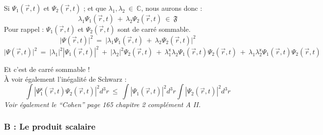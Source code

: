 \documentclass[12pt,a4paper,titlepage]{book}
\begin{document}
Si $\Psi_1 (\overrightarrow{r}, t)$ et $\Psi_2 (\overrightarrow{r}, t)$ ; et que $\lambda_1, \lambda_2 ~\in~ \mathbb{C}$, nous aurons donc :
\begin{equation*}
\lambda_1 \Psi_1 (\overrightarrow{r}, t) ~+~ \lambda_2 \Psi_2 (\overrightarrow{r}, t) ~\in~ \mathfrak{F}
\end{equation*}
Pour rappel : $\Psi_1 (\overrightarrow{r}, t)$ et $\Psi_2 (\overrightarrow{r}, t)$ sont de carré sommable.\\
\begin{equation*}
\vert \Psi (\overrightarrow{r}, t) \vert^2 ~=~ \vert \lambda_1 \Psi_1 (\overrightarrow{r}, t) ~+~ \lambda_2 \Psi_2 (\overrightarrow{r}, t) \vert^2
\end{equation*}
\begin{equation*}
\vert \Psi (\overrightarrow{r}, t) \vert^2 ~=~ |\lambda_1 |^2 |\Psi_1 (\overrightarrow{r}, t)|^2 ~+~ |\lambda_2 |^2 \Psi_2 (\overrightarrow{r}, t) ~+~ \lambda_1^{\mathsf{x}} \lambda_2 \Psi_1 (\overrightarrow{r}, t) \Psi_2 (\overrightarrow{r}, t) ~+~ \lambda_1 \lambda_2^{\mathsf{x}} \Psi_1 (\overrightarrow{r}, t) \Psi_2 (\overrightarrow{r}, t)
\end{equation*}

Et c'est de carré sommable !\\

À voir également l'inégalité de Schwarz :\\
\begin{equation*}
\int |\Psi_1^{\mathsf{x}} (\overrightarrow{r}, t) \Psi_2 (\overrightarrow{r}, t)|^2 d^3 r ~\leqslant~ \int |\Psi_1 (\overrightarrow{r}, t)|^2 d^3 r \int |\Psi_2 (\overrightarrow{r}, t)|^2 d^3 r
\end{equation*}
\textit{Voir également le \enquote{Cohen} page 165 chapitre 2 complément A II.}

\subsubsection{B : Le produit scalaire}
\end{document}
